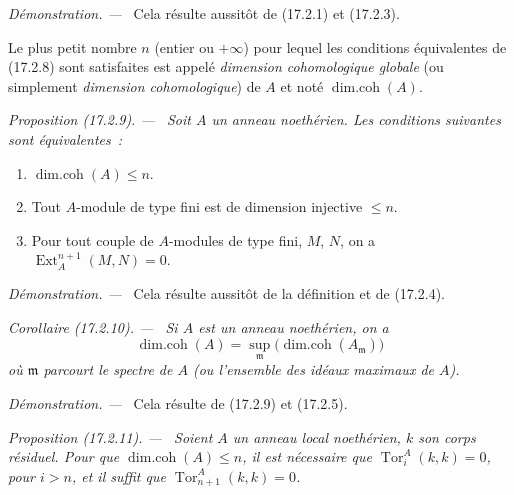 \documentclass[10pt,oneside]{book}
\makeatletter
\newcommand{\setmanualcurrentlabel}[1]{\def\@currentlabel{#1}}
\newcommand{\oldpage}[2][]{%
  \setcounter{footnote}{0}%
  \marginpar{\scriptsize\textbf{#1}~|~#2}\ignorespaces}
\newenvironment{proposition}[1][]{%
  \setmanualcurrentlabel{#1}\par\medskip\noindent\itshape Proposition (#1). ---\ }{\par}
\newenvironment{corollary}[1][]{%
  \setmanualcurrentlabel{#1}\par\medskip\noindent\itshape Corollaire (#1). ---\ }{\par}
\newenvironment{proof}{%
  \par\medskip\noindent\textit{Démonstration. ---\ }}{\par}
\makeatother
\begin{document}
\begin{proof}
\oldpage[0\textsubscript{IV-1}]{45}
Cela résulte aussitôt de (17.2.1) et (17.2.3).
\end{proof}

Le plus petit nombre $n$ (entier ou $+\infty$) pour lequel les conditions
équivalentes de (17.2.8) sont satisfaites est appelé \emph{dimension
cohomologique globale} (ou simplement \emph{dimension cohomologique}) de $A$
et noté $\operatorname{dim.coh}(A)$.

\begin{proposition}[17.2.9]
\label{0.17.2.9-fr}
Soit $A$ un anneau noethérien. Les conditions suivantes sont équivalentes~:
\begin{enumerate}
  \item[\rm a)] $\operatorname{dim.coh}(A)\leq n$.
  \item[\rm b)] Tout $A$-module de type fini est de dimension injective
  $\leq n$.
  \item[\rm c)] Pour tout couple de $A$-modules de type fini, $M$, $N$, on a
  $\operatorname{Ext}^{n+1}_A(M,N)=0$.
\end{enumerate}
\end{proposition}

\begin{proof}
Cela résulte aussitôt de la définition et de (17.2.4).
\end{proof}

\begin{corollary}[17.2.10]
\label{0.17.2.10-fr}
Si $A$ est un anneau noethérien, on a
\begin{equation}
\label{0.17.2.10.1-fr}
\tag{17.2.10.1}
  \operatorname{dim.coh}(A)
  =\sup_{\mathfrak{m}}
  \bigl(\operatorname{dim.coh}(A_{\mathfrak{m}})\bigr)
\end{equation}
où $\mathfrak{m}$ parcourt le spectre de $A$ (ou l'ensemble des idéaux
maximaux de $A$).
\end{corollary}

\begin{proof}
Cela résulte de (17.2.9) et (17.2.5).
\end{proof}

\begin{proposition}[17.2.11]
\label{0.17.2.11-fr}
Soient $A$ un anneau local noethérien, $k$ son corps résiduel. Pour que
$\operatorname{dim.coh}(A)\leq n$, il est nécessaire que
$\operatorname{Tor}^A_i(k,k)=0$, pour $i>n$, et il suffit que
$\operatorname{Tor}^A_{n+1}(k,k)=0$.
\end{proposition}
\end{document}
